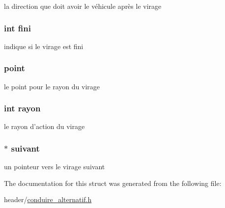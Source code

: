la direction que doit avoir le véhicule après le virage 

\hypertarget{struct_virage_a76db6e2a1080b7fef44d6887962a864f}{
\subsubsection[{fini}]{\setlength{\rightskip}{0pt plus 5cm}int fini}}\label{struct_virage_a76db6e2a1080b7fef44d6887962a864f}


indique si le virage est fini 

\hypertarget{struct_virage_ad99e63f3ba5dc63436b254343b8b5057}{
\subsubsection[{point}]{ point}}\label{struct_virage_ad99e63f3ba5dc63436b254343b8b5057}


le point pour le rayon du virage 

\hypertarget{struct_virage_a104155ea0ba383f3d696fdf8196bc0b8}{
\subsubsection[{rayon}]{\setlength{\rightskip}{0pt plus 5cm}int rayon}}\label{struct_virage_a104155ea0ba383f3d696fdf8196bc0b8}


le rayon d'action du virage 

\hypertarget{struct_virage_ae9110ead9c34ba987de098d29d89c3e1}{
\subsubsection[{suivant}]{$\ast$ suivant}}\label{struct_virage_ae9110ead9c34ba987de098d29d89c3e1}


un pointeur vers le virage suivant 



The documentation for this struct was generated from the following file\-:\begin{DoxyCompactItemize}
\item 
header/\hyperlink{conduire__alternatif_8h}{conduire\-\_\-alternatif.\-h}\end{DoxyCompactItemize}
